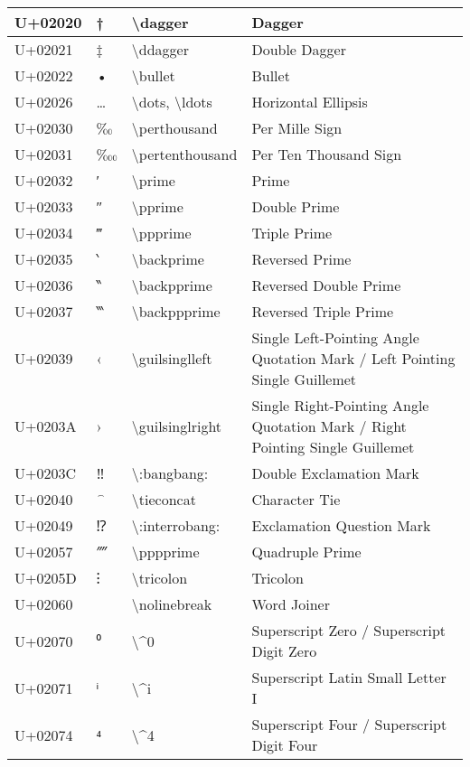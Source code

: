 \begin{table}[h]
\begin{tabulary}{\linewidth}{|L|L|L|L|}
\hline
U+02020 & † & {\textbackslash}dagger & Dagger \\
\hline
U+02021 & ‡ & {\textbackslash}ddagger & Double Dagger \\
\hline
U+02022 & • & {\textbackslash}bullet & Bullet \\
\hline
U+02026 & … & {\textbackslash}dots, {\textbackslash}ldots & Horizontal Ellipsis \\
\hline
U+02030 & ‰ & {\textbackslash}perthousand & Per Mille Sign \\
\hline
U+02031 & ‱ & {\textbackslash}pertenthousand & Per Ten Thousand Sign \\
\hline
U+02032 & ′ & {\textbackslash}prime & Prime \\
\hline
U+02033 & ″ & {\textbackslash}pprime & Double Prime \\
\hline
U+02034 & ‴ & {\textbackslash}ppprime & Triple Prime \\
\hline
U+02035 & ‵ & {\textbackslash}backprime & Reversed Prime \\
\hline
U+02036 & ‶ & {\textbackslash}backpprime & Reversed Double Prime \\
\hline
U+02037 & ‷ & {\textbackslash}backppprime & Reversed Triple Prime \\
\hline
U+02039 & ‹ & {\textbackslash}guilsinglleft & Single Left-Pointing Angle Quotation Mark / Left Pointing Single Guillemet \\
\hline
U+0203A & › & {\textbackslash}guilsinglright & Single Right-Pointing Angle Quotation Mark / Right Pointing Single Guillemet \\
\hline
U+0203C & ‼ & {\textbackslash}:bangbang: & Double Exclamation Mark \\
\hline
U+02040 & ⁀ & {\textbackslash}tieconcat & Character Tie \\
\hline
U+02049 & ⁉ & {\textbackslash}:interrobang: & Exclamation Question Mark \\
\hline
U+02057 & ⁗ & {\textbackslash}pppprime & Quadruple Prime \\
\hline
U+0205D & ⁝ & {\textbackslash}tricolon & Tricolon \\
\hline
U+02060 & ⁠ & {\textbackslash}nolinebreak & Word Joiner \\
\hline
U+02070 & ⁰ & {\textbackslash}{\textasciicircum}0 & Superscript Zero / Superscript Digit Zero \\
\hline
U+02071 & ⁱ & {\textbackslash}{\textasciicircum}i & Superscript Latin Small Letter I \\
\hline
U+02074 & ⁴ & {\textbackslash}{\textasciicircum}4 & Superscript Four / Superscript Digit Four \\

\end{tabulary}
\end{table}
